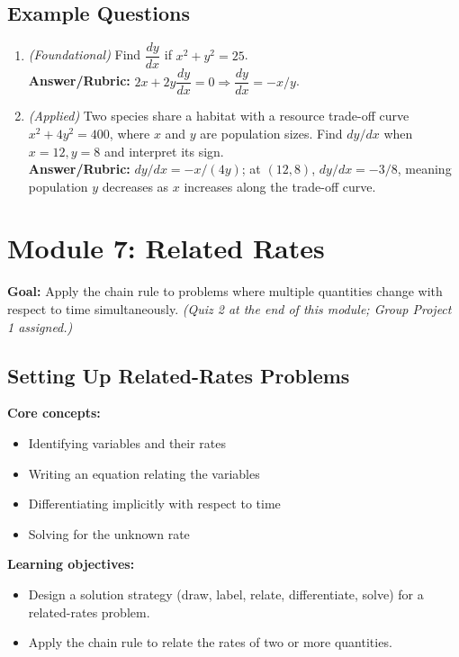 \documentclass{article}
\begin{document}
\subsection*{Example Questions}
\begin{enumerate}[leftmargin=*]
  \item \textit{(Foundational)} Find $\dfrac{dy}{dx}$ if $x^2 + y^2 = 25$. \\
  \textbf{Answer/Rubric:} $2x + 2y\dfrac{dy}{dx}=0 \Rightarrow \dfrac{dy}{dx} = -x/y$.
  \item \textit{(Applied)} Two species share a habitat with a resource trade-off curve $x^2 + 4y^2 = 400$, where $x$ and $y$ are population sizes. Find $dy/dx$ when $x=12, y=8$ and interpret its sign. \\
  \textbf{Answer/Rubric:} $dy/dx = -x/(4y)$; at $(12,8)$, $dy/dx = -3/8$, meaning population $y$ decreases as $x$ increases along the trade-off curve.
\end{enumerate}


\section{Module 7: Related Rates}
\textbf{Goal:} Apply the chain rule to problems where multiple quantities change with respect to time simultaneously. \textit{(Quiz 2 at the end of this module; Group Project 1 assigned.)}

\subsection{Setting Up Related-Rates Problems}
\textbf{Core concepts:}
\begin{itemize}[leftmargin=*]
  \item Identifying variables and their rates
  \item Writing an equation relating the variables
  \item Differentiating implicitly with respect to time
  \item Solving for the unknown rate
\end{itemize}
\textbf{Learning objectives:}
\begin{itemize}[leftmargin=*]
  \item Design a solution strategy (draw, label, relate, differentiate, solve) for a related-rates problem.
  \item Apply the chain rule to relate the rates of two or more quantities.
\end{itemize}
\end{document}
